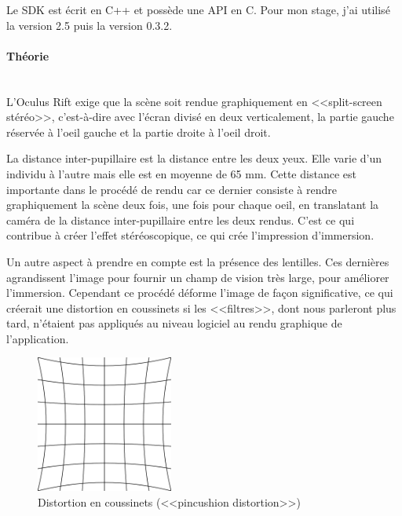 \documentclass[a4paper,french,12pt]{article}
\begin{document}
			    Le SDK est écrit en C++ et possède une API en C.
			    Pour mon stage, j'ai utilisé la version 2.5 puis la version 0.3.2.
			
			\paragraph{Théorie} ~\\
			
			    L'Oculus Rift exige que la scène soit rendue graphiquement en <<split-screen stéréo>>, 
			    c'est-à-dire avec l'écran divisé en deux verticalement, la partie gauche réservée à l'oeil gauche
			    et la partie droite à l'oeil droit.
			    
			    La distance inter-pupillaire est la distance entre les deux yeux. Elle varie d'un individu
			    à l'autre mais elle est en moyenne de 65 mm. Cette distance est importante dans le procédé 
			    de rendu car ce dernier consiste à rendre graphiquement la scène deux fois, une fois pour
			    chaque oeil, en translatant la caméra de la distance inter-pupillaire entre les deux rendus.
			    C'est ce qui contribue à créer l'effet stéréoscopique, ce qui crée l'impression d'immersion.
			
			    Un autre aspect à prendre en compte est la présence des lentilles. Ces dernières agrandissent
			    l'image pour fournir un champ de vision très large, pour améliorer l'immersion.
			    Cependant ce procédé déforme l'image de façon significative, ce qui créerait une distortion
			    en coussinets si les <<filtres>>, dont nous parleront plus tard,
			    n'étaient pas appliqués au niveau logiciel au rendu graphique de l'application.
			    
			     \begin{figure}[h!]
			      \centering
				\includegraphics[width=0.4\textwidth]{pincushion_distortion.png}
			      \caption{Distortion en coussinets (<<pincushion distortion>>)}
			    \end{figure}
			    
\end{document}
